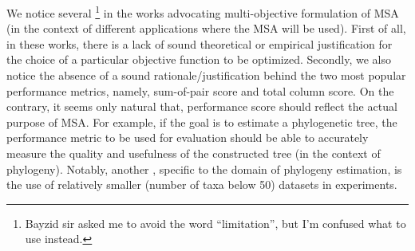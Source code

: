 We notice several  \footnote{Bayzid sir asked me to avoid the word ``limitation'', but I'm confused what to use instead.} in the works advocating multi-objective formulation of MSA (in the context of different applications where the MSA will be used). First of all, in these works, there is a lack of sound theoretical or empirical justification for the choice of a particular objective function to be optimized. Secondly, we also notice the absence of a sound rationale/justification behind the two most popular performance metrics, namely, sum-of-pair score and total column score. On the contrary, it seems only natural that, performance score should reflect the actual purpose of MSA. For example, if the goal is to estimate a phylogenetic tree, the performance metric to be used for evaluation should be able to accurately measure the quality and usefulness of the constructed tree (in the context of phylogeny). Notably, another , specific to the domain of phylogeny estimation, is the use of relatively smaller (number of taxa below 50) datasets in experiments. 

